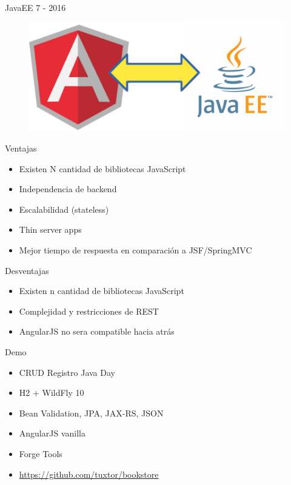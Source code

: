 \documentclass{beamer}
\begin{document}
\begin{frame}{JavaEE 7 - 2016}
	\begin{figure}
		\centering
		\includegraphics[width=0.8\linewidth]{Images/anguaree.png}
	\end{figure}
\end{frame}


\begin{frame}{Ventajas}
	\begin{itemize}
		\item Existen N cantidad de bibliotecas JavaScript
		\item Independencia de backend
		\item Escalabilidad (stateless)
		\item Thin server apps
		\item Mejor tiempo de respuesta en comparación a JSF/SpringMVC
	\end{itemize}
\end{frame}

\begin{frame}{Desventajas}
	\begin{itemize}
		\item Existen n cantidad de bibliotecas JavaScript
		\item Complejidad y restricciones de REST
		\item AngularJS no sera compatible hacia atrás
	\end{itemize}
\end{frame}

\begin{frame}{Demo}
	\begin{itemize}
		\item CRUD Registro Java Day
		\item H2 + WildFly 10
		\item Bean Validation, JPA, JAX-RS, JSON
		\item AngularJS vanilla
		\item Forge Tools
		\item \url{https://github.com/tuxtor/bookstore}
	\end{itemize}
\end{frame}
\end{document}
